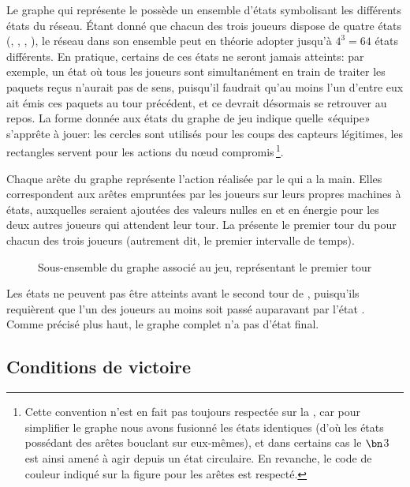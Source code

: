 Le graphe qui représente le  possède un ensemble d'états symbolisant les différents états du réseau.
Étant donné que chacun des trois joueurs dispose de quatre états (\idle, \send, \listen, \treatmsg), le réseau dans son ensemble peut en théorie adopter jusqu'à $4^3=64$ états différents.
En pratique, certains de ces états ne seront jamais atteints: par exemple, un état où tous les joueurs sont simultanément en train de traiter les paquets reçus n'aurait pas de sens, puisqu'il faudrait qu'au moins l'un d'entre eux ait émis ces paquets au tour précédent, et ce  devrait désormais se retrouver au repos.
La forme donnée aux états du graphe de jeu indique quelle «équipe» s'apprête à jouer: les cercles sont utilisés pour les coups des capteurs légitimes, les rectangles servent pour les actions du nœud compromis\,\footnote{Cette convention n'est en fait pas toujours respectée sur la , car pour simplifier le graphe nous avons fusionné les états identiques (d'où les états possédant des arêtes bouclant sur eux-mêmes), et dans certains cas le  $\bn$3 est ainsi amené à agir depuis un état circulaire. En revanche, le code de couleur indiqué sur la figure pour les arêtes est respecté.}.

Chaque arête du graphe représente l'action réalisée par le  qui a la main.
Elles correspondent aux arêtes empruntées par les joueurs sur leurs propres machines à états, auxquelles seraient ajoutées des valeurs nulles en  et en énergie pour les deux autres joueurs qui attendent leur tour.
La  présente le premier tour du  pour chacun des trois joueurs (autrement dit, le premier intervalle de temps).
\begin{figure}[p]
    \centering
    
    \caption{Sous-ensemble du graphe associé au jeu, représentant le premier tour}\label{tj:fig:autFirstTurn}
\end{figure}
Les états \treatmsg ne peuvent pas être atteints avant le second tour de , puisqu'ils requièrent que l'un des joueurs au moins soit passé auparavant par l'état \listen.
Comme précisé plus haut, le graphe complet n'a pas d'état final.

    \subsection{Conditions de victoire}

